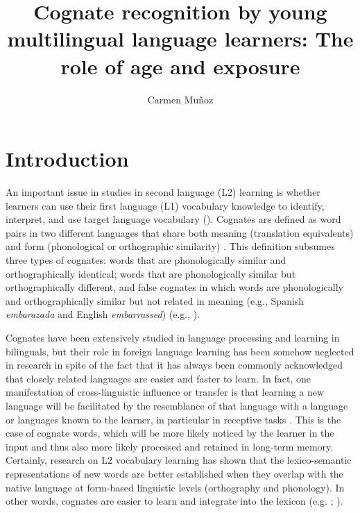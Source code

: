 \documentclass[output=paper,modfonts,nonflat,newtxmath]{langsci/langscibook}
\author{Carmen Muñoz\affiliation{Universitat de Barcelona}}
\title{{Cognate} {recognition} {by} {young} {multilingual} {language} {learners}: {The} {role} {of} {age} {and} {exposure}}
\begin{document}
\maketitle
{}

\section{Introduction}


 {An important issue in studies in second language (L2) learning is whether learners can use their first language (L1) vocabulary knowledge to identify, interpret, and use target language vocabulary (\citealt{MendezPerezEtAl2010}). Cognates are defined as word pairs in two different languages that share both meaning (translation equivalents) and form (phonological or orthographic similarity) \citep{KohnertEtAl2004}. This definition subsumes three types of cognates: words that are phonologically similar and orthographically identical; words that are phonologically similar but orthographically different, and false cognates in which words are phonologically and orthographically similar but not related in meaning (e.g., Spanish} {\textit{embarazada}} {and English} {\textit{embarrassed}}{) (e.g., \citealt{Rodriguez2001}).}

 {Cognates have been extensively studied in language processing and learning in bilinguals, but their role in foreign language learning has been somehow neglected in research in spite of the fact that it has always been commonly acknowledged that closely related languages are easier and faster to learn. In fact, one manifestation of cross-linguistic influence or transfer is that learning a new language will be facilitated by the resemblance of that language with a language or languages known to the learner, in particular in receptive tasks \citep{Ringbom2007}. This is the case of cognate words, which will be more likely noticed by the learner in the input and thus also more likely processed and retained in long-term memory. Certainly, research on L2 vocabulary learning has shown that the lexico-semantic representations of new words are better established when they overlap with the native language at form-based linguistic levels (orthography and phonology). In other words, cognates are easier to learn and integrate into the lexicon (e.g. \citealt{EllisNBeaton1993}; \citealt{DeGrootvanHell2005}).}
\end{document}
